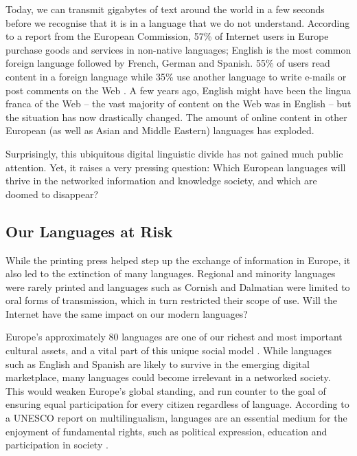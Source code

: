 \begin{multicols}{2}
Today, we can transmit gigabytes of text around the world in a few
seconds before we recognise that it is in a language that we do not
understand. According to a report from the European Commission,
57\% of Internet users in Europe purchase goods and services in non-native
languages; English is the most
common foreign language followed by French, German and Spanish. 55\%
of users read content in a foreign language while 35\% use another
language to write e-mails or post comments on the Web \cite{EC1}. A
few years ago, English might have been the lingua franca of the
Web -- the vast majority of content on the Web was in English -- but the
situation has now drastically changed. The amount of online content in
other European (as well as Asian and Middle Eastern) languages has
exploded.

Surprisingly, this ubiquitous digital linguistic divide has not gained
much public attention. Yet, it raises a very pressing question: Which European languages will thrive in the networked information and knowledge society, and which are doomed to disappear?

\subsection{Our Languages at Risk}

While the printing press helped step up the exchange of information in
Europe, it also led to the extinction of many
languages. Regional and minority languages were rarely printed and
languages such as Cornish and Dalmatian were limited to oral forms of
transmission, which in turn restricted their scope of use. Will the
Internet have the same impact on our modern languages?


Europe’s approximately 80 languages are one of our richest and most important cultural assets, and a vital part of this unique social model \cite{EC2}. While languages such as English and Spanish are likely to survive in the emerging digital marketplace, many languages could become irrelevant in a networked society. This would weaken Europe’s global standing, and run counter to the goal of ensuring equal participation for every citizen regardless of language. According to a UNESCO report on multilingualism, languages are an essential medium for the enjoyment of fundamental rights, such as political expression, education and participation in society \cite{Unesco1}.


\end{multicols}

